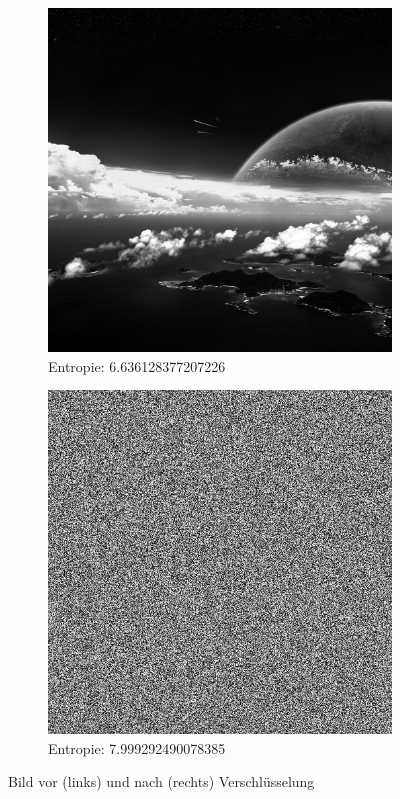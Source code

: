 \begin{figure}
	\centering

	\begin{subfigure}{0.35\textwidth}
		\includegraphics[width=\textwidth]{../1/3/gray_6.636128377207226_planet_sky.jpg}
		\caption{Entropie: 6.636128377207226}
	\end{subfigure}
	\hfill
	\begin{subfigure}{0.35\textwidth}
		\includegraphics[width=\textwidth]{../1/3/encrypted_7.9992924900783855_planet_sky.jpg}
		\caption{Entropie: 7.999292490078385}
	\end{subfigure}

	\caption{Bild vor (links) und nach (rechts) Verschlüsselung}
	\label{fig:sky}
\end{figure}


